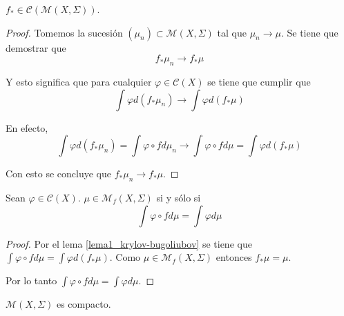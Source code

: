 \begin{lema}
	$f_* \in \mathcal{C}(\mathcal{M}(X,\Sigma))$. 
\end{lema}

\begin{proof}
	Tomemos la sucesión $(\mu_n) \subset \mathcal{M}(X,\Sigma)$ tal que $\mu_n \rightarrow \mu$. Se tiene que demostrar que
	\begin{equation}
		f_* \mu_n \rightarrow f_* \mu
	\end{equation}
	
	Y esto significa que para cualquier $\varphi \in \mathcal{C}(X)$ se tiene que cumplir que
	\begin{equation}
		\int \varphi d(f_* \mu_n) \rightarrow \int \varphi d(f_* \mu)
	\end{equation}
	
	En efecto,
	\begin{equation}
		\int \varphi d(f_* \mu_n) = \int \varphi \circ f d\mu_n \rightarrow \int \varphi \circ f d\mu = \int \varphi d(f_* \mu)
	\end{equation}
	
	Con esto se concluye que $f_* \mu_n \rightarrow f_* \mu$.
\end{proof}

\begin{lema}\label{lema3_krylov}
	Sean $\varphi \in \mathcal{C}(X)$. $\mu \in \mathcal{M}_f(X,\Sigma)$ si y sólo si	
	\begin{equation}
		\int \varphi \circ f d\mu = \int \varphi d\mu
	\end{equation}
\end{lema}

\begin{proof}
	Por el lema \ref{lema1_krylov-bugoliubov} se tiene que $\int \varphi \circ f d\mu = \int \varphi d(f_* \mu)$. Como $\mu \in \mathcal{M}_f(X,\Sigma)$ entonces $f_* \mu = \mu$.
	
	Por lo tanto $\int \varphi \circ f d\mu = \int \varphi d\mu$.
\end{proof}

\begin{lema}\label{krylov-bugoliubov-lema3}
	$\mathcal{M}(X,\Sigma)$ es compacto. 
\end{lema}

